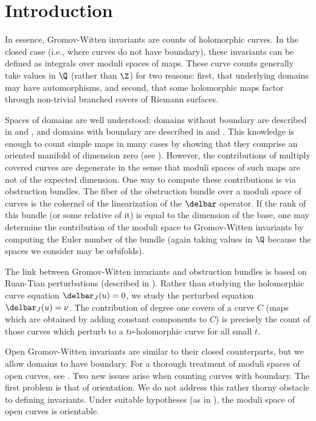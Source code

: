 \section{Introduction} \label{intro}

In essence, Gromov-Witten invariants are counts of holomorphic curves. In the closed case (i.e., where curves do not have boundary), these invariants can be defined as integrals over moduli spaces of maps. These curve counts generally take values in $\Q$ (rather than $\Z$) for two reasons: first, that underlying domains may have automorphisms, and second, that some holomorphic maps factor through non-trivial branched covers of Riemann surfaces.

Spaces of domains are well understood: domains without boundary are described in \cite{harris} and \cite{mumford}, and domains with boundary are described in \cite{katzLiu} and \cite{liu}. This knowledge is enough to count simple maps in many cases by showing that they comprise an oriented manifold of dimension zero (see \cite{msBig}). However, the contributions of multiply covered curves are degenerate in the sense that moduli spaces of such maps are not of the expected dimension. One way to compute these contributions is via obstruction bundles. The fiber of the obstruction bundle over a moduli space of curves is the cokernel of the linearization of the $\delbar$ operator. If the rank of this bundle (or some relative of it) is equal to the dimension of the base, one may determine the contribution of the moduli space to Gromov-Witten invariants by computing the Euler number of the bundle (again taking values in $\Q$ because the spaces we consider may be orbifolds).

The link between Gromov-Witten invariants and obstruction bundles is based on Ruan-Tian perturbations (described in \cite{rt}). Rather than studying the holomorphic curve equation $\delbar_J(u)=0$, we study the perturbed equation $\delbar_J(u)=\nu$. The contribution of degree one covers of a curve $C$ (maps which are obtained by adding constant components to $C$) is precisely the count of those curves which perturb to a $t\nu$-holomorphic curve for all small $t$.

Open Gromov-Witten invariants are similar to their closed counterparts, but we allow domains to have boundary. For a thorough treatment of moduli spaces of open curves, see \cite{liu}. Two new issues arise when counting curves with boundary. The first problem is that of orientation. We do not address this rather thorny obstacle to defining invariants. Under suitable hypotheses (as in \cite{ortn}), the moduli space of open curves is orientable.

